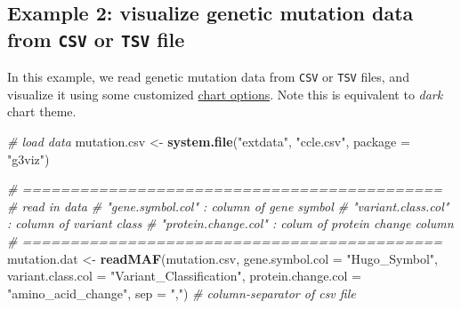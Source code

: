 \documentclass[
]{article}
\newenvironment{Shaded}{\begin{snugshade}}{\end{snugshade}}
\newcommand{\AttributeTok}[1]{\textcolor[rgb]{0.13,0.29,0.53}{#1}}
\newcommand{\CommentTok}[1]{\textcolor[rgb]{0.56,0.35,0.01}{\textit{#1}}}
\newcommand{\FunctionTok}[1]{\textcolor[rgb]{0.13,0.29,0.53}{\textbf{#1}}}
\newcommand{\NormalTok}[1]{#1}
\newcommand{\OtherTok}[1]{\textcolor[rgb]{0.56,0.35,0.01}{#1}}
\newcommand{\StringTok}[1]{\textcolor[rgb]{0.31,0.60,0.02}{#1}}
\begin{document}
\subsection{\texorpdfstring{Example 2: visualize genetic mutation data
from \texttt{CSV} or \texttt{TSV}
file}{Example 2: visualize genetic mutation data from CSV or TSV file}}\label{example-2-visualize-genetic-mutation-data-from-csv-or-tsv-file}

In this example, we read genetic mutation data from \texttt{CSV} or
\texttt{TSV} files, and visualize it using some customized
\hyperref[options]{chart options}. Note this is equivalent to
\emph{dark} chart theme.

\begin{Shaded}
\begin{Highlighting}[]
\CommentTok{\# load data}
\NormalTok{mutation.csv }\OtherTok{\textless{}{-}} \FunctionTok{system.file}\NormalTok{(}\StringTok{"extdata"}\NormalTok{, }\StringTok{"ccle.csv"}\NormalTok{, }\AttributeTok{package =} \StringTok{"g3viz"}\NormalTok{)}

\CommentTok{\# ============================================}
\CommentTok{\# read in data}
\CommentTok{\#   "gene.symbol.col"    : column of gene symbol}
\CommentTok{\#   "variant.class.col"  : column of variant class}
\CommentTok{\#   "protein.change.col" : colum of protein change column}
\CommentTok{\# ============================================}
\NormalTok{mutation.dat }\OtherTok{\textless{}{-}} \FunctionTok{readMAF}\NormalTok{(mutation.csv,}
                        \AttributeTok{gene.symbol.col =} \StringTok{"Hugo\_Symbol"}\NormalTok{,}
                        \AttributeTok{variant.class.col =} \StringTok{"Variant\_Classification"}\NormalTok{,}
                        \AttributeTok{protein.change.col =} \StringTok{"amino\_acid\_change"}\NormalTok{,}
                        \AttributeTok{sep =} \StringTok{","}\NormalTok{)  }\CommentTok{\# column{-}separator of csv file}


\end{Highlighting}
\end{Shaded}
\end{document}
